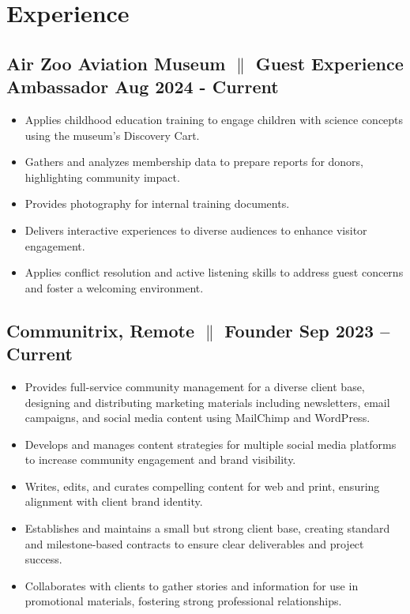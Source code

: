 \documentclass[a4paper,12pt]{article} %
\begin{document}
\section{Experience}
\subsection{\small{ Air Zoo Aviation Museum {$\parallel$} {Guest Experience Ambassador} \hfill \textbf{Aug 2024 - Current}}}
\begin{itemize}
    \item Applies childhood education training to engage children with science concepts using the museum’s Discovery Cart.
    \item Gathers and analyzes membership data to prepare reports for donors, highlighting community impact.
    \item Provides photography for internal training documents.
    \item Delivers interactive experiences to diverse audiences to enhance visitor engagement.
    \item Applies conflict resolution and active listening skills to address guest concerns and foster a welcoming environment.
\end{itemize}
\subsection{Communitrix, Remote {$\parallel$}{ Founder} \hfill
      \textbf{Sep 2023 – Current}}
\begin{itemize}
      \item Provides full-service community management for a diverse client base, designing and distributing marketing materials including newsletters, email campaigns, and social media content using MailChimp and WordPress.
      \item Develops and manages content strategies for multiple social media platforms to increase community engagement and brand visibility.
      \item Writes, edits, and curates compelling content for web and print, ensuring alignment with client brand identity.
      \item Establishes and maintains a small but strong client base, creating standard and milestone-based contracts to ensure clear deliverables and project success.
      \item Collaborates with clients to gather stories and information for use in promotional materials, fostering strong professional relationships.
\end{itemize}
\end{document}
